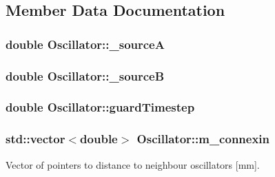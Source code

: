 \subsection{Member Data Documentation}
\hypertarget{class_oscillator_a968627d069d5f0c44d8134718a01237f}{
\subsubsection[{\+\_\+source\+A}]{\setlength{\rightskip}{0pt plus 5cm}double Oscillator\+::\+\_\+source\+A}}\label{class_oscillator_a968627d069d5f0c44d8134718a01237f}
\hypertarget{class_oscillator_a5a144fd5dd7cbcbfc47d7c9013d330b8}{
\subsubsection[{\+\_\+source\+B}]{\setlength{\rightskip}{0pt plus 5cm}double Oscillator\+::\+\_\+source\+B}}\label{class_oscillator_a5a144fd5dd7cbcbfc47d7c9013d330b8}
\hypertarget{class_oscillator_a4db30c0516d078b69426aad65bf13022}{
\subsubsection[{guard\+Timestep}]{\setlength{\rightskip}{0pt plus 5cm}double Oscillator\+::guard\+Timestep}}\label{class_oscillator_a4db30c0516d078b69426aad65bf13022}
\hypertarget{class_oscillator_a94d86971a2a425d2e2492962491dc01b}{
\subsubsection[{m\+\_\+connexin}]{\setlength{\rightskip}{0pt plus 5cm}std\+::vector$<$double$>$ Oscillator\+::m\+\_\+connexin}}\label{class_oscillator_a94d86971a2a425d2e2492962491dc01b}


Vector of pointers to distance to neighbour oscillators \mbox{[}mm\mbox{]}. 

